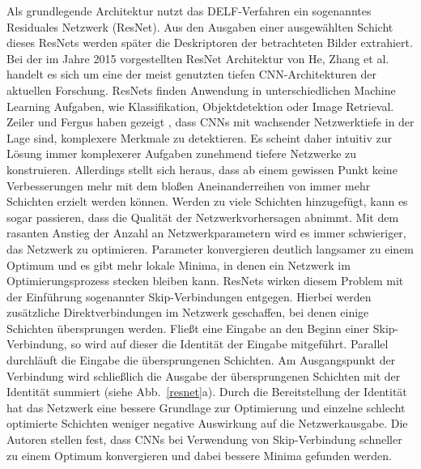 Als grundlegende Architektur nutzt das DELF-Verfahren ein sogenanntes Residuales Netzwerk (ResNet). Aus den Ausgaben einer ausgewählten Schicht dieses ResNets werden später die Deskriptoren der betrachteten Bilder extrahiert. Bei der im Jahre 2015 vorgestellten ResNet Architektur \cite{resnet} von He, Zhang et al. handelt es sich um eine der meist genutzten tiefen CNN-Architekturen der aktuellen Forschung. ResNets finden Anwendung in unterschiedlichen Machine Learning Aufgaben, wie Klassifikation, Objektdetektion oder Image Retrieval.\\
Zeiler und Fergus haben gezeigt \cite{extraction_point_meaning}, dass CNNs mit wachsender Netzwerktiefe in der Lage sind, komplexere Merkmale zu detektieren. Es scheint daher intuitiv zur Lösung immer komplexerer Aufgaben zunehmend tiefere Netzwerke zu konstruieren. Allerdings stellt sich heraus, dass ab einem gewissen Punkt keine Verbesserungen mehr mit dem bloßen Aneinanderreihen von immer mehr Schichten erzielt werden können. Werden zu viele Schichten hinzugefügt, kann es sogar passieren, dass die Qualität der Netzwerkvorhersagen abnimmt. Mit dem rasanten Anstieg der Anzahl an Netzwerkparametern wird es immer schwieriger, das Netzwerk zu optimieren. Parameter konvergieren deutlich langsamer zu einem Optimum und es gibt mehr lokale Minima, in denen ein Netzwerk im Optimierungsprozess stecken bleiben kann. ResNets wirken diesem Problem mit der Einführung sogenannter Skip-Verbindungen entgegen. Hierbei werden zusätzliche Direktverbindungen im Netzwerk geschaffen, bei denen einige Schichten übersprungen werden. Fließt eine Eingabe an den Beginn einer Skip-Verbindung, so wird auf dieser die Identität der Eingabe mitgeführt. Parallel durchläuft die Eingabe die übersprungenen Schichten. Am Ausgangspunkt der Verbindung wird schließlich die Ausgabe der übersprungenen Schichten mit der Identität summiert (siehe Abb.~\ref{resnet}a). Durch die Bereitstellung der Identität hat das Netzwerk eine bessere Grundlage zur Optimierung und einzelne schlecht optimierte Schichten weniger negative Auswirkung auf die Netzwerkausgabe. Die Autoren stellen fest, dass CNNs bei Verwendung von Skip-Verbindung schneller zu einem Optimum konvergieren und dabei bessere Minima gefunden werden. 
\\
